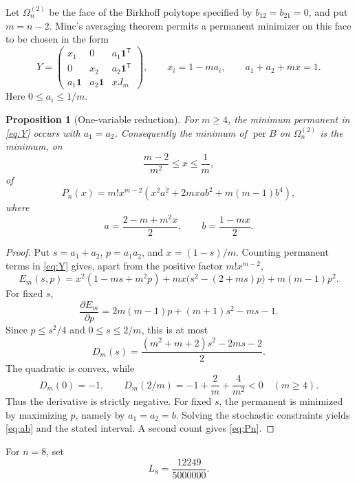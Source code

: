 \documentclass[11pt]{article}
\newtheorem{proposition}[theorem]{Proposition}
\theoremstyle{remark}
\newcommand{\per}{\operatorname{per}}
\newcommand{\one}{\mathbf 1}
\begin{document}
Let $\Omega_n^{(2)}$ be the face of the Birkhoff polytope specified by
$b_{12}=b_{21}=0$, and put $m=n-2$.  Minc's averaging theorem permits a
permanent minimizer on this face to be chosen in the form
\begin{equation}\label{eq:Y}
 Y=
 \begin{pmatrix}
 x_1&0&a_1\one^{\mathsf T}\\
 0&x_2&a_2\one^{\mathsf T}\\
 a_1\one&a_2\one&xJ_m
 \end{pmatrix},
 \qquad x_i=1-ma_i,
 \qquad a_1+a_2+mx=1.
\end{equation}
Here $0\le a_i\le1/m$.

\begin{proposition}[One-variable reduction]\label{prop:face-reduction}
For $m\ge4$, the minimum permanent in \eqref{eq:Y} occurs with $a_1=a_2$.
Consequently the minimum of $\per B$ on $\Omega_n^{(2)}$ is the minimum, on
\[
 \frac{m-2}{m^2}\le x\le\frac1m,
\]
of
\begin{equation}\label{eq:Pn}
 P_n(x)=m!x^{m-2}
 \left(x^2a^2+2mxab^2+m(m-1)b^4\right),
\end{equation}
where
\begin{equation}\label{eq:ab}
 a=\frac{2-m+m^2x}{2},\qquad b=\frac{1-mx}{2}.
\end{equation}
\end{proposition}
\begin{proof}
Put $s=a_1+a_2$, $p=a_1a_2$, and $x=(1-s)/m$.  Counting permanent terms in
\eqref{eq:Y} gives, apart from the positive factor $m!x^{m-2}$,
\[
 E_m(s,p)=x^2(1-ms+m^2p)
 +mx\bigl(s^2-(2+ms)p\bigr)+m(m-1)p^2.
\]
For fixed $s$,
\[
 \frac{\partial E_m}{\partial p}
 =2m(m-1)p+(m+1)s^2-ms-1.
\]
Since $p\le s^2/4$ and $0\le s\le2/m$, this is at most
\[
 D_m(s)=\frac{(m^2+m+2)s^2-2ms-2}{2}.
\]
The quadratic is convex, while
\[
 D_m(0)=-1,
 \qquad D_m(2/m)=-1+\frac2m+\frac4{m^2}<0
 \quad(m\ge4).
\]
Thus the derivative is strictly negative.  For fixed $s$, the permanent is
minimized by maximizing $p$, namely by $a_1=a_2=b$.  Solving the stochastic
constraints yields \eqref{eq:ab} and the stated interval.  A second count
gives \eqref{eq:Pn}.
\end{proof}

For $n=8$, set
\begin{equation}\label{eq:L}
 L_8=\frac{12249}{5000000}.
\end{equation}
\end{document}
